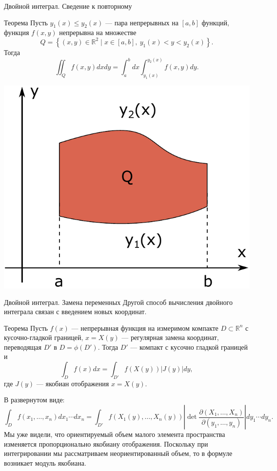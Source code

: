 \documentclass[8pt]{beamer}
\newcommand{\pp}[2]{\frac{\partial #1}{\partial #2}}
\begin{document}
\begin{frame}{Двойной интеграл. Сведение к повторному}
\begin{block}{Теорема}
Пусть $y_1(x)\le y_2(x)$ --- пара непрерывных на $[a,b]$ функций, функция $f(x,y)$ непрерывна на множестве
$$Q =\left\{ (x,y)\in\mathbb{R}^2 \mid
 x\in[a,b],\ y_1(x)<y<y_2(x) \right\}.$$
Тогда
$$\iint_Q f(x,y)dxdy =\int_a^b dx \int_{y_1(x)}^{y_2(x)}f(x,y)dy.$$
\end{block}
\begin{center}
\includegraphics[scale=0.4]{iintQ.pdf}
\end{center}
\end{frame}

\begin{frame}{Двойной интеграл. Замена переменных}
Другой способ вычисления двойного интеграла связан с введением новых координат.
\begin{block}{Теорема}
Пусть $f(x)$ --- непрерывная функция на измеримом компакте $D\subset\mathbb{R}^n$ с кусочно-гладкой границей,  $x = X(y)$ --- регулярная замена координат, переводящая $D'$ в $D = \phi(D')$. Тогда $D'$ --- компакт с кусочно гладкой границей и
$$\int_D f(x)dx= \int_{D'} f(X(y))|J(y)|dy,$$
где $J(y)$ --- якобиан отображения $x=X(y)$.
\end{block}
В развернутом виде:
$$\int_D f(x_1,\ldots, x_n)dx_1\cdots dx_n= \int_{D'} f(X_1(y),\ldots, X_n(y))\left| \det \pp{(X_1,\ldots, X_n)}{(y_1,\ldots,y_n)}\right| dy_1\cdots dy_n.$$
Мы уже видели, что ориентируемый объем малого элемента пространства изменяется пропорционально якобиану отображения. Поскольку при интегрировании мы рассматриваем неориентированный объем, то в формуле возникает модуль якобиана.
\end{frame}
\end{document}
